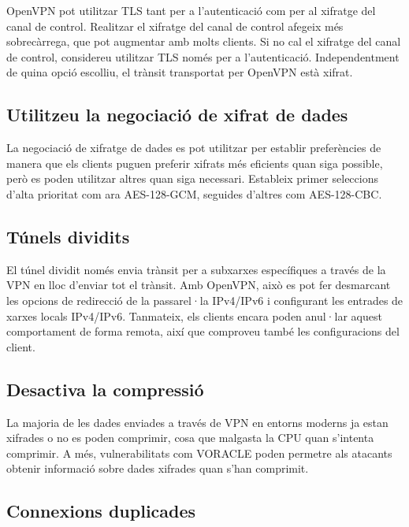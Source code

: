 \documentclass[
  10pt,
]{krantz}
\begin{document}
OpenVPN pot utilitzar TLS tant per a l'autenticació com per al xifratge del canal de control. Realitzar el xifratge del canal de control afegeix més sobrecàrrega, que pot augmentar amb molts clients. Si no cal el xifratge del canal de control, considereu utilitzar TLS només per a l'autenticació. Independentment de quina opció escolliu, el trànsit transportat per OpenVPN està xifrat.

\hypertarget{utilitzeu-la-negociaciuxf3-de-xifrat-de-dades}{%
\subsection{Utilitzeu la negociació de xifrat de dades}\label{utilitzeu-la-negociaciuxf3-de-xifrat-de-dades}}

La negociació de xifratge de dades es pot utilitzar per establir preferències de manera que els clients puguen preferir xifrats més eficients quan siga possible, però es poden utilitzar altres quan siga necessari. Estableix primer seleccions d'alta prioritat com ara AES-128-GCM, seguides d'altres com AES-128-CBC.

\hypertarget{tuxfanels-dividits}{%
\subsection{Túnels dividits}\label{tuxfanels-dividits}}

El túnel dividit només envia trànsit per a subxarxes específiques a través de la VPN en lloc d'enviar tot el trànsit. Amb OpenVPN, això es pot fer desmarcant les opcions de redirecció de la passarel·la IPv4/IPv6 i configurant les entrades de xarxes locals IPv4/IPv6. Tanmateix, els clients encara poden anul·lar aquest comportament de forma remota, així que comproveu també les configuracions del client.

\hypertarget{desactiva-la-compressiuxf3}{%
\subsection{Desactiva la compressió}\label{desactiva-la-compressiuxf3}}

La majoria de les dades enviades a través de VPN en entorns moderns ja estan xifrades o no es poden comprimir, cosa que malgasta la CPU quan s'intenta comprimir. A més, vulnerabilitats com VORACLE poden permetre als atacants obtenir informació sobre dades xifrades quan s'han comprimit.

\hypertarget{connexions-duplicades}{%
\subsection{Connexions duplicades}\label{connexions-duplicades}}
\end{document}
